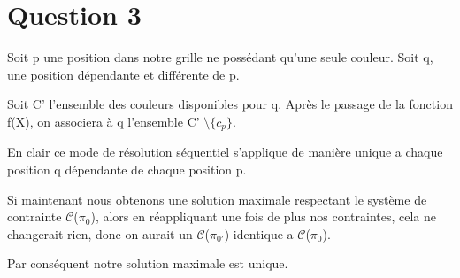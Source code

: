 
\section{Question 3}

Soit p une position dans notre grille ne poss\'edant qu'une seule couleur. Soit q, une position d\'ependante et diff\'erente de p. 

Soit C' l'ensemble des couleurs disponibles pour q. Apr\`es le passage de la fonction f(X), on associera \`a q l'ensemble C' $\setminus \lbrace c_p \rbrace$. 

\bigskip
En clair ce mode de r\'esolution s\'equentiel s'applique de mani\`ere unique a chaque position q d\'ependante de chaque position p.

Si maintenant nous obtenons une solution maximale respectant le syst\`eme de contrainte $\mathcal{C}$($\pi_0$), alors en r\'eappliquant une fois de plus nos contraintes, cela ne changerait rien, donc on aurait un $\mathcal{C}$($\pi_{0'}$) identique a $\mathcal{C}$($\pi_0$). 

Par cons\'equent notre solution maximale est unique.